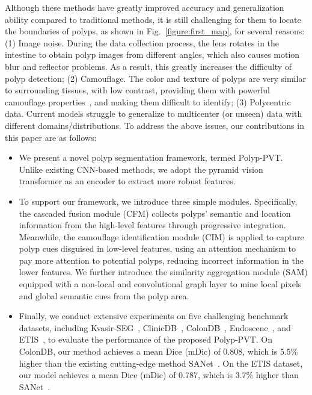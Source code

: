\documentclass[journal]{IEEEtran}
\newcommand{\figref}[1]{Fig.~\ref{#1}}
\def\ourmodel{Polyp-PVT}
\begin{document}
Although these methods have greatly improved accuracy and generalization ability compared to traditional methods, it is still challenging for them to locate the boundaries of polyps, as shown in \figref{figure:first_map}, for several reasons:
(1) \textcolor[RGB]{31,100,212}{Image noise.} During the data collection process, the lens rotates in the intestine to obtain polyp images from different angles, which also causes motion blur and reflector problems. As a result, this greatly increases the difficulty of polyp detection;
(2) \textcolor[RGB]{31,100,212}{Camouflage.} The color and texture of polyps are very similar to surrounding tissues, with low contrast, providing them with powerful camouflage properties~\cite{fan2021concealed,fan2020camouflaged}, and making them difficult to identify;
(3) \textcolor[RGB]{31,100,212}{Polycentric data.} Current models struggle to generalize to multicenter (or unseen) data with different domains/distributions.
To address the above issues, our contributions in this paper are as follows:

\begin{itemize}
\item We present a novel polyp segmentation framework, termed \ourmodel. Unlike existing CNN-based methods, we adopt the pyramid vision transformer as an encoder to extract more robust features.

\vspace{-5pt}
\item To support our framework, we introduce three simple modules. Specifically, the cascaded fusion module (CFM) collects polyps' semantic and location information from the high-level features through progressive integration. 
Meanwhile, the camouflage identification module (CIM) is applied to capture polyp cues disguised in low-level features, using an attention mechanism to pay more attention to potential polyps, reducing incorrect information in the lower features. 
We further introduce the similarity aggregation module (SAM) equipped with a non-local and convolutional graph layer to mine local pixels and global semantic cues from the polyp area.

\vspace{-5pt}
\item Finally, we conduct extensive experiments on five challenging benchmark datasets, including Kvasir-SEG~\cite{jha2020kvasir}, ClinicDB~\cite{bernal2015wm}, ColonDB~\cite{tajbakhsh2015automated}, Endoscene~\cite{vazquez2017benchmark}, and ETIS~\cite{silva2014toward}, to evaluate the performance of the proposed \ourmodel.
On ColonDB, our method achieves a mean Dice (mDic) of 0.808, which is 5.5\% higher than the existing cutting-edge method SANet~\cite{wei2021shallow}.
On the ETIS dataset, our model achieves a mean Dice (mDic) of 0.787, which is 3.7\% higher than SANet~\cite{wei2021shallow}.
\end{itemize}
\end{document}
